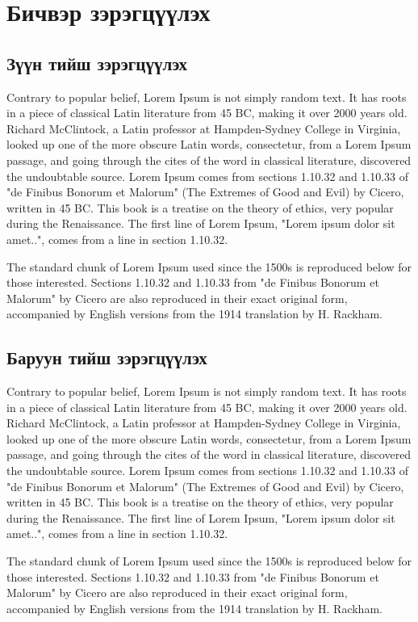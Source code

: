 \section{Бичвэр зэрэгцүүлэх}
\subsection{Зүүн тийш зэрэгцүүлэх}
\begin{flushleft}
	Contrary to popular belief, Lorem Ipsum is not simply random text. It has roots in a piece of classical Latin literature from 45 BC, making it over 2000 years old. Richard McClintock, a Latin professor at Hampden-Sydney College in Virginia, looked up one of the more obscure Latin words, consectetur, from a Lorem Ipsum passage, and going through the cites of the word in classical literature, discovered the undoubtable source. Lorem Ipsum comes from sections 1.10.32 and 1.10.33 of "de Finibus Bonorum et Malorum" (The Extremes of Good and Evil) by Cicero, written in 45 BC. This book is a treatise on the theory of ethics, very popular during the Renaissance. The first line of Lorem Ipsum, "Lorem ipsum dolor sit amet..", comes from a line in section 1.10.32.

	The standard chunk of Lorem Ipsum used since the 1500s is reproduced below for those interested. Sections 1.10.32 and 1.10.33 from "de Finibus Bonorum et Malorum" by Cicero are also reproduced in their exact original form, accompanied by English versions from the 1914 translation by H. Rackham.
\end{flushleft}

\subsection{Баруун тийш зэрэгцүүлэх}
\begin{flushright}
	Contrary to popular belief, Lorem Ipsum is not simply random text. It has roots in a piece of classical Latin literature from 45 BC, making it over 2000 years old. Richard McClintock, a Latin professor at Hampden-Sydney College in Virginia, looked up one of the more obscure Latin words, consectetur, from a Lorem Ipsum passage, and going through the cites of the word in classical literature, discovered the undoubtable source. Lorem Ipsum comes from sections 1.10.32 and 1.10.33 of "de Finibus Bonorum et Malorum" (The Extremes of Good and Evil) by Cicero, written in 45 BC. This book is a treatise on the theory of ethics, very popular during the Renaissance. The first line of Lorem Ipsum, "Lorem ipsum dolor sit amet..", comes from a line in section 1.10.32.

	The standard chunk of Lorem Ipsum used since the 1500s is reproduced below for those interested. Sections 1.10.32 and 1.10.33 from "de Finibus Bonorum et Malorum" by Cicero are also reproduced in their exact original form, accompanied by English versions from the 1914 translation by H. Rackham.
\end{flushright}


